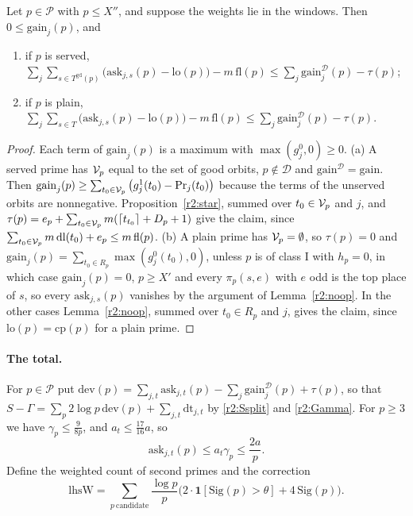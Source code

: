 \begin{proposition}\label{r2:perprime}
Let $p\in\mathcal P$ with $p\le X''$, and suppose the weights lie in the windows. Then $0\le\mathrm{gain}_j(p)$, and
\begin{enumerate}
\item[(a)] if $p$ is served, $\sum_j\sum_{s\in T^{\mathrm{gd}}(p)}\big(\mathrm{ask}_{j,s}(p)-\mathrm{lo}(p)\big)-m\,\mathrm{fl}(p)\le\sum_j\mathrm{gain}^{\mathcal D}_j(p)-\tau(p)$;
\item[(b)] if $p$ is plain, $\sum_j\sum_{s\in T}\big(\mathrm{ask}_{j,s}(p)-\mathrm{lo}(p)\big)-m\,\mathrm{fl}(p)\le\sum_j\mathrm{gain}^{\mathcal D}_j(p)-\tau(p)$.
\end{enumerate}
\end{proposition}

\begin{proof}
Each term of $\mathrm{gain}_j(p)$ is a maximum with $\max(g^0_j,0)\ge0$. (a) A served prime has $\mathcal V_p$ equal to the set of good orbits, $p\notin\mathcal D$ and $\mathrm{gain}^{\mathcal D}=\mathrm{gain}$. Then $\mathrm{gain}_j(p)\ge\sum_{t_0\in\mathcal V_p}\big(g^1_j(t_0)-\mathrm{Pr}_j(t_0)\big)$ because the terms of the unserved orbits are nonnegative. Proposition~\ref{r2:star}, summed over $t_0\in\mathcal V_p$ and $j$, and $\tau(p)=e_p+\sum_{t_0\in\mathcal V_p}m(\lceil t_{t_0}\rceil+D_p+1)$ give the claim, since $\sum_{t_0\in\mathcal V_p}m\,\mathrm{dl}(t_0)+e_p\le m\,\mathrm{fl}(p)$. (b) A plain prime has $\mathcal V_p=\emptyset$, so $\tau(p)=0$ and $\mathrm{gain}_j(p)=\sum_{t_0\in R_p}\max(g^0_j(t_0),0)$, unless $p$ is of class I with $h_p=0$, in which case $\mathrm{gain}_j(p)=0$, $p\ge X'$ and every $\pi_p(s,e)$ with $e$ odd is the top place of $s$, so every $\mathrm{ask}_{j,s}(p)$ vanishes by the argument of Lemma~\ref{r2:noop}. In the other cases Lemma~\ref{r2:noop}, summed over $t_0\in R_p$ and $j$, gives the claim, since $\mathrm{lo}(p)=\mathrm{cp}(p)$ for a plain prime.
\end{proof}

\paragraph{The total.} For $p\in\mathcal P$ put $\mathrm{dev}(p)=\sum_{j,t}\mathrm{ask}_{j,t}(p)-\sum_j\mathrm{gain}^{\mathcal D}_j(p)+\tau(p)$, so that $S-\Gamma=\sum_p2\log p\,\mathrm{dev}(p)+\sum_{j,t}\mathrm{dt}_{j,t}$ by \eqref{r2:Ssplit} and \eqref{r2:Gamma}. For $p\ge3$ we have $\gamma_p\le\frac9{8p}$, and $a_t\le\frac{17}{16}a$, so
\begin{equation}\label{r2:askbound}
\mathrm{ask}_{j,t}(p)\le a_t\gamma_p\le\frac{2a}p .
\end{equation}
Define the weighted count of second primes and the correction
\[
\mathrm{lhsW}=\sum_{p\ \mathrm{candidate}}\frac{\log p}p\Big(2\cdot\mathbf 1[\mathrm{Sig}(p)>\theta]+4\,\mathrm{Sig}(p)\Big).
\]

